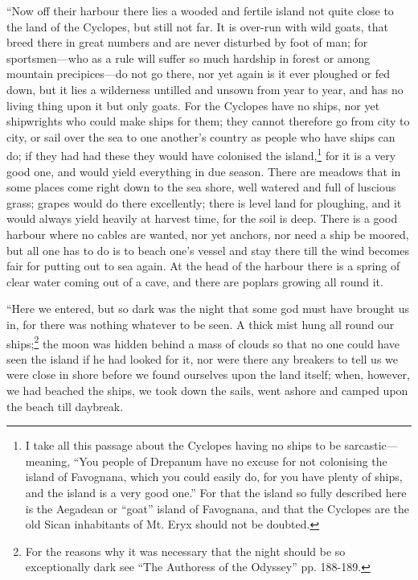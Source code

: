 “Now off their harbour there lies a wooded and fertile island not quite close
to the land of the Cyclopes, but still not far. It is over-run with wild goats,
that breed there in great numbers and are never disturbed by foot of man; for
sportsmen—who as a rule will suffer so much hardship in forest or among
mountain precipices—do not go there, nor yet again is it ever ploughed or fed
down, but it lies a wilderness untilled and unsown from year to year, and has
no living thing upon it but only goats. For the Cyclopes have no ships, nor yet
shipwrights who could make ships for them; they cannot therefore go from city
to city, or sail over the sea to one another’s country as people who have ships
can do; if they had had these they would have colonised the island,\footnote{I take all this passage about the Cyclopes having no ships to be
sarcastic—meaning, “You people of Drepanum have no excuse for not colonising
the island of Favognana, which you could easily do, for you have plenty of
ships, and the island is a very good one.” For that the island so fully
described here is the Aegadean or “goat” island of Favognana, and that the
Cyclopes are the old Sican inhabitants of Mt. Eryx should not be doubted.} for it is a very
good one, and would yield everything in due season. There are meadows that in
some places come right down to the sea shore, well watered and full of luscious
grass; grapes would do there excellently; there is level land for ploughing,
and it would always yield heavily at harvest time, for the soil is deep. There
is a good harbour where no cables are wanted, nor yet anchors, nor need a ship
be moored, but all one has to do is to beach one’s vessel and stay there till
the wind becomes fair for putting out to sea again. At the head of the harbour
there is a spring of clear water coming out of a cave, and there are poplars
growing all round it.

“Here we entered, but so dark was the night that some god must have brought us
in, for there was nothing whatever to be seen. A thick mist hung all round our
ships;\footnote{For the reasons why it was necessary that the night should be so
exceptionally dark see “The Authoress of the Odyssey” pp. 188-189.} the moon
was hidden behind a mass of clouds so that no one could have seen the island if
he had looked for it, nor were there any breakers to tell us we were close in
shore before we found ourselves upon the land itself; when, however, we had
beached the ships, we took down the sails, went ashore and camped upon the
beach till daybreak.

